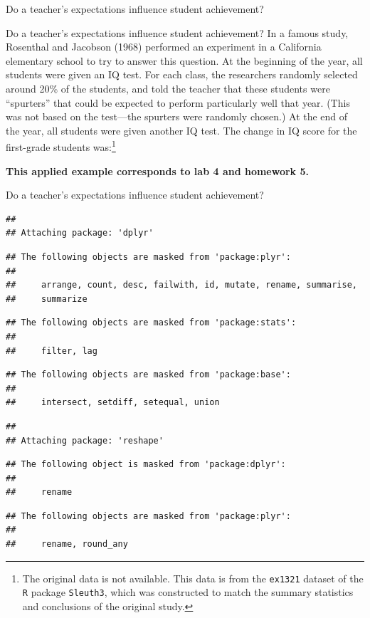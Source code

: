 \documentclass[
  ignorenonframetext,
]{beamer}
\begin{document}
\begin{frame}{Do a teacher's expectations influence student
achievement?}
\protect\hypertarget{do-a-teachers-expectations-influence-student-achievement}{}

Do a teacher's expectations influence student achievement? In a famous
study, Rosenthal and Jacobson (1968) performed an experiment in a
California elementary school to try to answer this question. At the
beginning of the year, all students were given an IQ test. For each
class, the researchers randomly selected around 20\% of the students,
and told the teacher that these students were ``spurters'' that could be
expected to perform particularly well that year. (This was not based on
the test---the spurters were randomly chosen.) At the end of the year,
all students were given another IQ test. The change in IQ score for the
first-grade students
was:\footnote{The original data is not available. This data is from the \texttt{ex1321} dataset of the \texttt{R} package \texttt{Sleuth3}, which was constructed to match the summary statistics and conclusions of the original study.}

\textbf{This applied example corresponds to lab 4 and homework 5.}

\end{frame}

\begin{frame}[fragile]{Do a teacher's expectations influence student
achievement?}
\protect\hypertarget{do-a-teachers-expectations-influence-student-achievement-1}{}

\begin{verbatim}
## 
## Attaching package: 'dplyr'
\end{verbatim}

\begin{verbatim}
## The following objects are masked from 'package:plyr':
## 
##     arrange, count, desc, failwith, id, mutate, rename, summarise,
##     summarize
\end{verbatim}

\begin{verbatim}
## The following objects are masked from 'package:stats':
## 
##     filter, lag
\end{verbatim}

\begin{verbatim}
## The following objects are masked from 'package:base':
## 
##     intersect, setdiff, setequal, union
\end{verbatim}

\begin{verbatim}
## 
## Attaching package: 'reshape'
\end{verbatim}

\begin{verbatim}
## The following object is masked from 'package:dplyr':
## 
##     rename
\end{verbatim}

\begin{verbatim}
## The following objects are masked from 'package:plyr':
## 
##     rename, round_any
\end{verbatim}

\end{frame}
\end{document}
